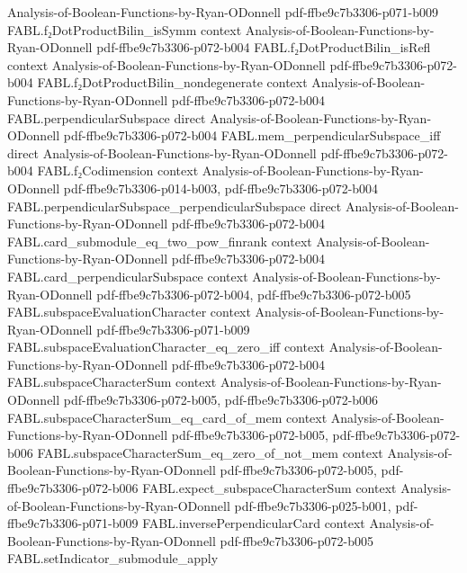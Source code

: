 \begin{theorem}
  {Analysis-of-Boolean-Functions-by-Ryan-ODonnell}
  {pdf-ffbe9c7b3306-p071-b009}
\proofstep
  {FABL.f₂DotProductBilin_isSymm}
  {context}
  {Analysis-of-Boolean-Functions-by-Ryan-ODonnell}
  {pdf-ffbe9c7b3306-p072-b004}
\proofstep
  {FABL.f₂DotProductBilin_isRefl}
  {context}
  {Analysis-of-Boolean-Functions-by-Ryan-ODonnell}
  {pdf-ffbe9c7b3306-p072-b004}
\proofstep
  {FABL.f₂DotProductBilin_nondegenerate}
  {context}
  {Analysis-of-Boolean-Functions-by-Ryan-ODonnell}
  {pdf-ffbe9c7b3306-p072-b004}
\proofstep
  {FABL.perpendicularSubspace}
  {direct}
  {Analysis-of-Boolean-Functions-by-Ryan-ODonnell}
  {pdf-ffbe9c7b3306-p072-b004}
\proofstep
  {FABL.mem_perpendicularSubspace_iff}
  {direct}
  {Analysis-of-Boolean-Functions-by-Ryan-ODonnell}
  {pdf-ffbe9c7b3306-p072-b004}
\proofstep
  {FABL.f₂Codimension}
  {context}
  {Analysis-of-Boolean-Functions-by-Ryan-ODonnell}
  {pdf-ffbe9c7b3306-p014-b003,
    pdf-ffbe9c7b3306-p072-b004}
\proofstep
  {FABL.perpendicularSubspace_perpendicularSubspace}
  {direct}
  {Analysis-of-Boolean-Functions-by-Ryan-ODonnell}
  {pdf-ffbe9c7b3306-p072-b004}
\proofstep
  {FABL.card_submodule_eq_two_pow_finrank}
  {context}
  {Analysis-of-Boolean-Functions-by-Ryan-ODonnell}
  {pdf-ffbe9c7b3306-p072-b004}
\proofstep
  {FABL.card_perpendicularSubspace}
  {context}
  {Analysis-of-Boolean-Functions-by-Ryan-ODonnell}
  {pdf-ffbe9c7b3306-p072-b004,
    pdf-ffbe9c7b3306-p072-b005}
\proofstep
  {FABL.subspaceEvaluationCharacter}
  {context}
  {Analysis-of-Boolean-Functions-by-Ryan-ODonnell}
  {pdf-ffbe9c7b3306-p071-b009}
\proofstep
  {FABL.subspaceEvaluationCharacter_eq_zero_iff}
  {context}
  {Analysis-of-Boolean-Functions-by-Ryan-ODonnell}
  {pdf-ffbe9c7b3306-p072-b004}
\proofstep
  {FABL.subspaceCharacterSum}
  {context}
  {Analysis-of-Boolean-Functions-by-Ryan-ODonnell}
  {pdf-ffbe9c7b3306-p072-b005,
    pdf-ffbe9c7b3306-p072-b006}
\proofstep
  {FABL.subspaceCharacterSum_eq_card_of_mem}
  {context}
  {Analysis-of-Boolean-Functions-by-Ryan-ODonnell}
  {pdf-ffbe9c7b3306-p072-b005,
    pdf-ffbe9c7b3306-p072-b006}
\proofstep
  {FABL.subspaceCharacterSum_eq_zero_of_not_mem}
  {context}
  {Analysis-of-Boolean-Functions-by-Ryan-ODonnell}
  {pdf-ffbe9c7b3306-p072-b005,
    pdf-ffbe9c7b3306-p072-b006}
\proofstep
  {FABL.expect_subspaceCharacterSum}
  {context}
  {Analysis-of-Boolean-Functions-by-Ryan-ODonnell}
  {pdf-ffbe9c7b3306-p025-b001,
    pdf-ffbe9c7b3306-p071-b009}
\proofstep
  {FABL.inversePerpendicularCard}
  {context}
  {Analysis-of-Boolean-Functions-by-Ryan-ODonnell}
  {pdf-ffbe9c7b3306-p072-b005}
\proofstep
  {FABL.setIndicator_submodule_apply}

\end{theorem}
